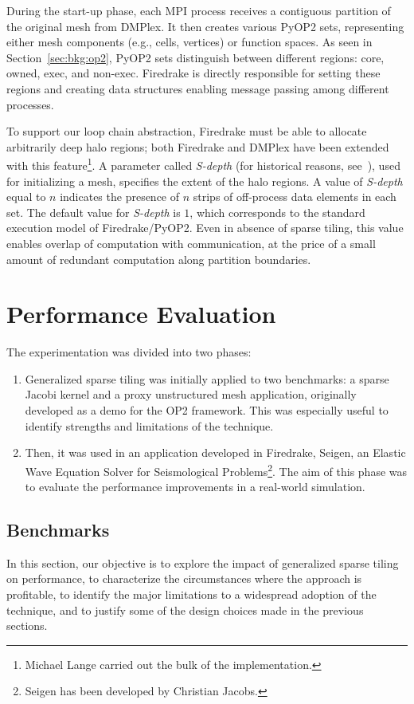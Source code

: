 During the start-up phase, each MPI process receives a contiguous partition of the original mesh from DMPlex. It then creates various PyOP2 sets, representing either mesh components (e.g., cells, vertices) or function spaces. As seen in Section~\ref{sec:bkg:op2}, PyOP2 sets distinguish between different regions: core, owned, exec, and non-exec. Firedrake is directly responsible for setting these regions and creating data structures enabling message passing among different processes.

To support our loop chain abstraction, Firedrake must be able to allocate arbitrarily deep halo regions; both Firedrake and DMPlex have been extended with this feature\footnote{Michael Lange carried out the bulk of the implementation.}. A parameter called {\em S-depth} (for historical reasons, see~\cite{s-depth-paper}), used for initializing a mesh, specifies the extent of the halo regions. A value of {\em S-depth} equal to $n$ indicates the presence of $n$ strips of off-process data elements in each set. The default value for {\em S-depth} is $1$, which corresponds to the standard execution model of Firedrake/PyOP2. Even in absence of sparse tiling, this value enables overlap of computation with communication, at the price of a small amount of redundant computation along partition boundaries.


\section{Performance Evaluation}
The experimentation was divided into two phases:

\begin{enumerate}
\item Generalized sparse tiling was initially applied to two benchmarks: a sparse Jacobi kernel and a proxy unstructured mesh application, originally developed as a demo for the OP2 framework. This was especially useful to identify strengths and limitations of the technique.
\item Then, it was used in an application developed in Firedrake, Seigen, an Elastic Wave Equation Solver for Seismological Problems\footnote{Seigen has been developed by Christian Jacobs.}. The aim of this phase was to evaluate the performance improvements in a real-world simulation.
\end{enumerate}



\subsection{Benchmarks}
In this section, our objective is to explore the impact of generalized sparse tiling on performance, to characterize the circumstances where the approach is profitable, to identify the major limitations to a widespread adoption of the technique, and to justify some of the design choices made in the previous sections.

